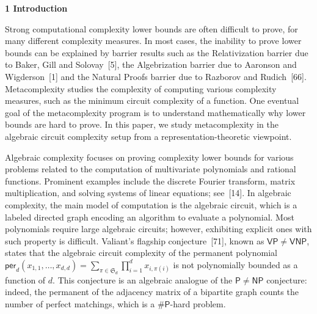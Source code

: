 

\par\medskip\noindent\textbf{1 Introduction}\par




Strong computational complexity lower bounds are often difficult to prove, for many different complexity measures. In most cases, the inability to prove lower bounds can be explained by barrier results such as the Relativization barrier due to Baker, Gill and Solovay [5], the Algebrization barrier due to Aaronson and Wigderson [1] and the Natural Proofs barrier due to Razborov and Rudich [66]. Metacomplexity studies the complexity of computing various complexity measures, such as the minimum circuit complexity of a function.
One eventual goal of the metacomplexity program is to understand mathematically why lower bounds are hard to prove.
In this paper, we study metacomplexity in the algebraic circuit complexity setup from a representation-theoretic viewpoint.





Algebraic complexity focuses on proving complexity lower bounds for various problems related to the computation of multivariate polynomials and rational functions. Prominent examples include the discrete Fourier transform, matrix multiplication, and solving systems of linear equations; see [14].
In algebraic complexity, the main model of computation is the algebraic circuit, which is a labeled directed graph encoding an algorithm to evaluate a polynomial. Most polynomials require large algebraic circuits; however, exhibiting explicit ones with such property is difficult. Valiant’s flagship conjecture [71], known as $\mathsf{VP}\neq\mathsf{VNP}$, states that the algebraic circuit complexity of the permanent polynomial $\mathsf{per}_{d}(x_{1,1},\dots,x_{d,d})=\sum_{\pi\in\mathfrak{S}_{d}}\prod_{i=1}^{d}x_{i,\pi(i)}$ is not polynomially bounded as a function of $d$. This conjecture is an algebraic analogue of the $\mathsf{P}\neq\mathsf{NP}$ conjecture: indeed, the permanent of the adjacency matrix of a bipartite graph counts the number of perfect matchings, which is a $\#\mathsf{P}$-hard problem.





